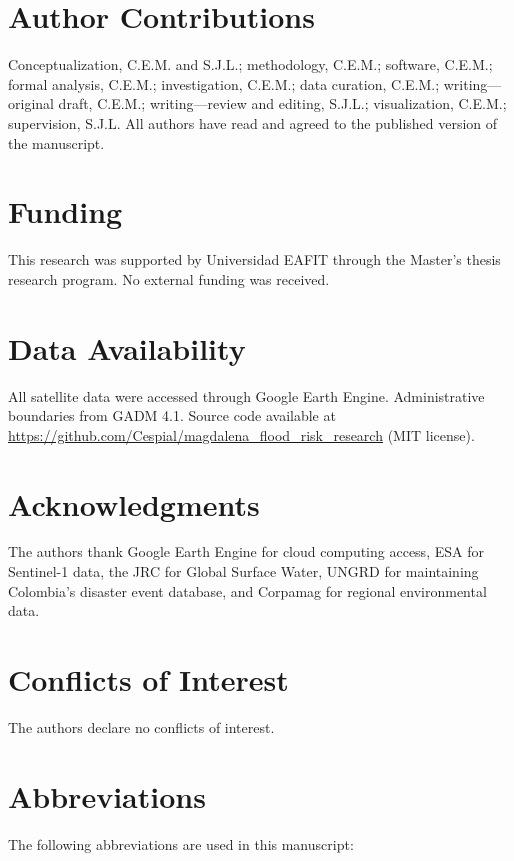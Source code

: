 \documentclass{article}
\begin{document}
\section*{Author Contributions}

Conceptualization, C.E.M. and S.J.L.; methodology, C.E.M.; software, C.E.M.; formal analysis, C.E.M.; investigation, C.E.M.; data curation, C.E.M.; writing---original draft, C.E.M.; writing---review and editing, S.J.L.; visualization, C.E.M.; supervision, S.J.L. All authors have read and agreed to the published version of the manuscript.

\section*{Funding}

This research was supported by Universidad EAFIT through the Master's thesis research program. No external funding was received.

\section*{Data Availability}

All satellite data were accessed through Google Earth Engine. Administrative boundaries from GADM 4.1. Source code available at \url{https://github.com/Cespial/magdalena_flood_risk_research} (MIT license).

\section*{Acknowledgments}

The authors thank Google Earth Engine for cloud computing access, ESA for Sentinel-1 data, the JRC for Global Surface Water, UNGRD for maintaining Colombia's disaster event database, and Corpamag for regional environmental data.

\section*{Conflicts of Interest}

The authors declare no conflicts of interest.

\section*{Abbreviations}

The following abbreviations are used in this manuscript:\\
\end{document}
